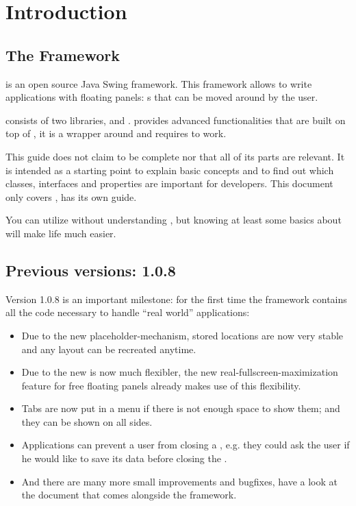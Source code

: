 \section{Introduction}
\subsection{The Framework}
 is an open source Java Swing framework. This framework allows to write applications with floating panels: s that can be moved around by the user.

 consists of two libraries,  and .  provides advanced functionalities that are built on top of , it is a wrapper around  and requires  to work.

This guide does not claim to be complete nor that all of its parts are relevant. It is intended as a starting point to explain basic concepts and to find out which classes, interfaces and properties are important for developers. This document only covers ,  has its own guide. 

You can utilize  without understanding , but knowing at least some basics about  will make life much easier.

\subsection{Previous versions: 1.0.8}
Version 1.0.8 is an important milestone: for the first time the framework contains all the code necessary to handle ``real world'' applications:\begin{itemize}
 \item Due to the new placeholder-mechanism, stored locations are now very stable and any layout can be recreated anytime.
 \item Due to the new   is now much flexibler, the new real-fullscreen-maximization feature for free floating panels already makes use of this flexibility.
 \item Tabs are now put in a menu if there is not enough space to show them; and they can be shown on all sides.
 \item Applications can prevent a user from closing a , e.g. they could ask the user if he would like to save its data before closing the .
 \item And there are many more small improvements and bugfixes, have a look at the  document that comes alongside the framework.
\end{itemize}


